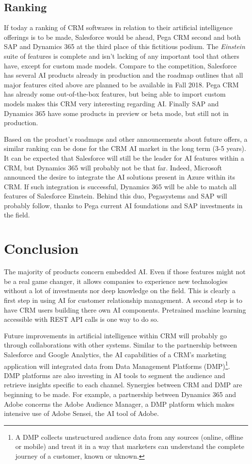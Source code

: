 \subsection{Ranking}
If today a ranking of CRM softwares in relation to their artificial intelligence offerings is to be made, Salesforce would be ahead, Pega CRM second and both SAP and Dynamics 365 at the third place of this fictitious podium. The \textit{Einstein} suite of features is complete and isn't lacking of any important tool that others have, except for custom made models. Compare to the competition, Salesforce has several AI products already in production and the roadmap outlines that all major features cited above are planned to be available in Fall 2018. Pega CRM has already some out-of-the-box features, but being able to import custom models makes this CRM very interesting regarding AI. Finally SAP and Dynamics 365 have some products in preview or beta mode, but still not in production. 

Based on the product's roadmaps and other announcements about future offers, a similar ranking can be done for the CRM AI market in the long term (3-5 years). It can be expected that Salesforce will still be the leader for AI features within a CRM, but Dynamics 365 will probably not be that far. Indeed, Microsoft announced the desire to integrate the AI solutions present in Azure within its CRM. If such integration is successful, Dynamics 365 will be able to match all features of Salesforce Einstein. Behind this duo, Pegasystems and SAP will probably follow, thanks to Pega current AI foundations and SAP investments in the field. 


\section{Conclusion}
The majority of products concern embedded AI. Even if those features might not be a real game changer, it allows companies to experience new technologies without a lot of investments nor deep knowledge on the field. This is clearly a first step in using AI for customer relationship management. A second step is to have CRM users building there own AI components. Pretrained machine learning accessible with REST API calls is one way to do so.

Future improvements in artificial intelligence within CRM will probably go through collaborations with other systems. Similar to the partnership between Salesforce and Google Analytics, the AI capabilities of a CRM's marketing application will integrated data from Data Management Platforms (DMP)\footnote{A DMP collects unstructured audience data from any sources (online, offline or mobile) and treat it in a way that marketers can understand the complete journey of a customer, known or uknown.}. DMP platforms are also investing in AI tools to segment the audience and retrieve insights specific to each channel. Synergies between CRM and DMP are beginning to be made. For example, a partnership between Dynamics 365 and Adobe concerns the Adobe Audience Manager, a DMP platform which makes intensive use of Adobe Sensei, the AI tool of Adobe.

